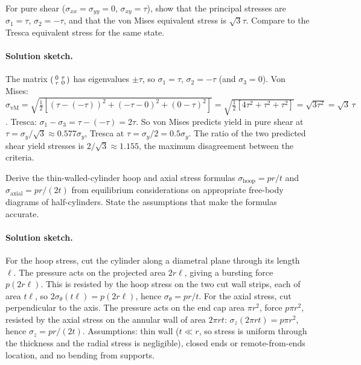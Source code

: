 \begin{exercise}
For pure shear ($\sigma_{xx} = \sigma_{yy} = 0$, $\sigma_{xy} =
\tau$), show that the principal stresses are $\sigma_1 = \tau$,
$\sigma_2 = -\tau$, and that the von Mises equivalent stress is
$\sqrt{3} \tau$. Compare to the Tresca equivalent stress for the
same state.
\paragraph{Solution sketch.} The matrix $\begin{psmallmatrix}0 & \tau\\
\tau & 0\end{psmallmatrix}$ has eigenvalues $\pm\tau$, so $\sigma_1 =
\tau$, $\sigma_2 = -\tau$ (and $\sigma_3 = 0$). Von Mises:
$\sigma_{\text{vM}} = \sqrt{\tfrac{1}{2}[(\tau-(-\tau))^2 + (-\tau-0)^2
+ (0-\tau)^2]} = \sqrt{\tfrac{1}{2}[4\tau^2 + \tau^2 + \tau^2]} =
\sqrt{3\tau^2} = \sqrt{3}\,\tau$. Tresca: $\sigma_1 - \sigma_3 =
\tau - (-\tau) = 2\tau$. So von Mises predicts yield in pure shear at
$\tau = \sigma_y/\sqrt{3} \approx 0.577\sigma_y$, Tresca at $\tau =
\sigma_y/2 = 0.5\sigma_y$. The ratio of the two predicted shear yield
stresses is $2/\sqrt{3} \approx 1.155$, the maximum disagreement
between the criteria.
\end{exercise}

\begin{exercise}
Derive the thin-walled-cylinder hoop and axial stress formulas
$\sigma_{\text{hoop}} = pr/t$ and $\sigma_{\text{axial}} = pr/(2t)$
from equilibrium considerations on appropriate free-body diagrams of
half-cylinders. State the assumptions that make the formulas
accurate.
\paragraph{Solution sketch.} For the hoop stress, cut the cylinder
along a diametral plane through its length $\ell$. The pressure acts on
the projected area $2r\ell$, giving a bursting force $p(2r\ell)$. This
is resisted by the hoop stress on the two cut wall strips, each of area
$t\ell$, so $2\sigma_{\theta}(t\ell) = p(2r\ell)$, hence
$\sigma_{\theta} = pr/t$. For the axial stress, cut perpendicular to
the axis. The pressure acts on the end cap area $\pi r^2$, force
$p\pi r^2$, resisted by the axial stress on the annular wall of area
$2\pi r t$: $\sigma_z(2\pi r t) = p\pi r^2$, hence $\sigma_z = pr/(2t)$.
Assumptions: thin wall ($t \ll r$, so stress is uniform through the
thickness and the radial stress is negligible), closed ends or
remote-from-ends location, and no bending from supports.
\end{exercise}

